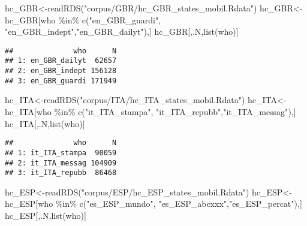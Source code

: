 \documentclass[
]{article}
\newenvironment{Shaded}{\begin{snugshade}}{\end{snugshade}}
\newcommand{\FunctionTok}[1]{\textcolor[rgb]{0.00,0.00,0.00}{#1}}
\newcommand{\NormalTok}[1]{#1}
\newcommand{\OtherTok}[1]{\textcolor[rgb]{0.56,0.35,0.01}{#1}}
\newcommand{\SpecialCharTok}[1]{\textcolor[rgb]{0.00,0.00,0.00}{#1}}
\newcommand{\StringTok}[1]{\textcolor[rgb]{0.31,0.60,0.02}{#1}}
\begin{document}
\begin{Shaded}
\begin{Highlighting}[]
\NormalTok{hc\_GBR}\OtherTok{\textless{}{-}}\FunctionTok{readRDS}\NormalTok{(}\StringTok{"corpus/GBR/hc\_GBR\_states\_mobil.Rdata"}\NormalTok{)}
\NormalTok{hc\_GBR}\OtherTok{\textless{}{-}}\NormalTok{hc\_GBR[who }\SpecialCharTok{\%in\%}  \FunctionTok{c}\NormalTok{(}\StringTok{"en\_GBR\_guardi"}\NormalTok{, }\StringTok{"en\_GBR\_indept"}\NormalTok{,}\StringTok{"en\_GBR\_dailyt"}\NormalTok{),]}
\NormalTok{hc\_GBR[,.N,}\FunctionTok{list}\NormalTok{(who)]}
\end{Highlighting}
\end{Shaded}

\begin{verbatim}
##              who      N
## 1: en_GBR_dailyt  62657
## 2: en_GBR_indept 156128
## 3: en_GBR_guardi 171949
\end{verbatim}

\begin{Shaded}
\begin{Highlighting}[]
\NormalTok{hc\_ITA}\OtherTok{\textless{}{-}}\FunctionTok{readRDS}\NormalTok{(}\StringTok{"corpus/ITA/hc\_ITA\_states\_mobil.Rdata"}\NormalTok{)}
\NormalTok{hc\_ITA}\OtherTok{\textless{}{-}}\NormalTok{hc\_ITA[who }\SpecialCharTok{\%in\%}  \FunctionTok{c}\NormalTok{(}\StringTok{"it\_ITA\_stampa"}\NormalTok{, }\StringTok{"it\_ITA\_repubb"}\NormalTok{,}\StringTok{"it\_ITA\_messag"}\NormalTok{),]}
\NormalTok{hc\_ITA[,.N,}\FunctionTok{list}\NormalTok{(who)]}
\end{Highlighting}
\end{Shaded}

\begin{verbatim}
##              who      N
## 1: it_ITA_stampa  90059
## 2: it_ITA_messag 104909
## 3: it_ITA_repubb  86468
\end{verbatim}

\begin{Shaded}
\begin{Highlighting}[]
\NormalTok{hc\_ESP}\OtherTok{\textless{}{-}}\FunctionTok{readRDS}\NormalTok{(}\StringTok{"corpus/ESP/hc\_ESP\_states\_mobil.Rdata"}\NormalTok{)}
\NormalTok{hc\_ESP}\OtherTok{\textless{}{-}}\NormalTok{hc\_ESP[who }\SpecialCharTok{\%in\%}  \FunctionTok{c}\NormalTok{(}\StringTok{"es\_ESP\_mundo"}\NormalTok{, }\StringTok{"es\_ESP\_abcxxx"}\NormalTok{,}\StringTok{"es\_ESP\_percat"}\NormalTok{),]}
\NormalTok{hc\_ESP[,.N,}\FunctionTok{list}\NormalTok{(who)]}
\end{Highlighting}
\end{Shaded}
\end{document}
